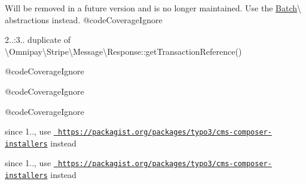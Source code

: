 \begin{DoxyRefList}
%
Will be removed in a future version and is no longer maintained. Use the \mbox{\hyperlink{namespace_guzzle_1_1_batch}{Batch}}\textbackslash{} abstractions instead. @code\+Coverage\+Ignore  
\item[Global \mbox{\hyperlink{class_omnipay_1_1_stripe_1_1_message_1_1_response_aadf390119b675a4dffeeca0ce700b3f0}{Response\+::get\+Charge\+Reference}} ()]\label{deprecated__deprecated000038}%
%
2..\+:3.. duplicate of \textbackslash{}\+Omnipay\textbackslash{}\+Stripe\textbackslash{}\+Message\textbackslash{}\+Response\+::get\+Transaction\+Reference()  
\item[Global \mbox{\hyperlink{class_guzzle_1_1_http_1_1_message_1_1_response_a4e2e388aa8933eada32c42ede59d3b3c}{Response\+::get\+Previous\+Response}} ()]\label{deprecated__deprecated000023}%
%
 @code\+Coverage\+Ignore  
\item[Global \mbox{\hyperlink{class_guzzle_1_1_http_1_1_message_1_1_response_adf1a35ad20e475c59cc0967d5764aa22}{Response\+::get\+Request}} ()]\label{deprecated__deprecated000025}%
%
 @code\+Coverage\+Ignore  
\item[Global \mbox{\hyperlink{class_symfony_1_1_component_1_1_http_foundation_1_1_response_a2a0f1ea0bfc029451152f971847c7372}{Response\+::HTTP\+\_\+\+RESERVED\+\_\+\+FOR\+\_\+\+WEBDAV\+\_\+\+ADVANCED\+\_\+\+COLLECTIONS\+\_\+\+EXPIRED\+\_\+\+PROPOSAL}} ]\label{deprecated__deprecated000055}%
%
  
\item[Global \mbox{\hyperlink{class_guzzle_1_1_http_1_1_message_1_1_response_a95600329ce766a968853543f20271ffd}{Response\+::set\+Request}} (\$request)]\label{deprecated__deprecated000024}%
%
 @code\+Coverage\+Ignore  
\item[Class \mbox{\hyperlink{class_composer_1_1_installers_1_1_t_y_p_o3_cms_installer}{TYPO3\+Cms\+Installer}} ]\label{deprecated__deprecated000060}%
%
since 1.., use \href{https://packagist.org/packages/typo3/cms-composer-installers}{\texttt{ https\+://packagist.\+org/packages/typo3/cms-\/composer-\/installers}} instead

\label{deprecated__deprecated000061}%
%
since 1.., use \href{https://packagist.org/packages/typo3/cms-composer-installers}{\texttt{ https\+://packagist.\+org/packages/typo3/cms-\/composer-\/installers}} instead


\end{DoxyRefList}
